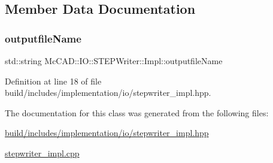 \subsection{Member Data Documentation}
\mbox{\label{classMcCAD_1_1IO_1_1STEPWriter_1_1Impl_ae943ccd3f778c6c211f67be535fdc93f}} 
\subsubsection{\texorpdfstring{outputfile\+Name}{outputfileName}}
{\footnotesize\ttfamily std\+::string Mc\+C\+A\+D\+::\+I\+O\+::\+S\+T\+E\+P\+Writer\+::\+Impl\+::outputfile\+Name}



Definition at line 18 of file build/includes/implementation/io/stepwriter\+\_\+impl.\+hpp.



The documentation for this class was generated from the following files\+:\begin{DoxyCompactItemize}
\item 
\hyperlink{build_2includes_2implementation_2io_2stepwriter__impl_8hpp}{build/includes/implementation/io/stepwriter\+\_\+impl.\+hpp}\item 
\hyperlink{stepwriter__impl_8cpp}{stepwriter\+\_\+impl.\+cpp}\end{DoxyCompactItemize}
